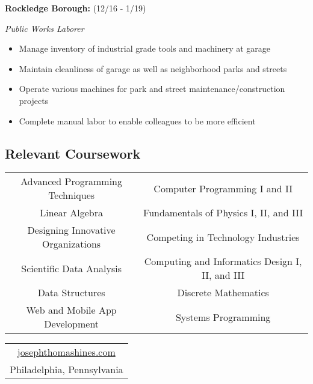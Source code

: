 \documentclass[10pt]{article}
\begin{document}
\begin{multicols}{2}
\textbf{Rockledge Borough:} (12/16 - 1/19)

\emph{Public Works Laborer}

\begin{itemize}
\setlength\itemsep{0.5em}
\item Manage inventory of industrial grade tools and machinery
at garage
\item Maintain cleanliness of garage as well as neighborhood
parks and streets
\item Operate various machines for park and street
	maintenance/construction projects
\item Complete manual labor to enable colleagues to be more
efficient
\end{itemize}

\end{multicols}

\subsection*{Relevant Coursework}%
\label{sub:Relevant Coursework}

\null

\begin{center}
\begin{tabular}{cc}
	\hline
	Advanced Programming Techniques & Computer Programming I and II \\
	Linear Algebra & Fundamentals of Physics I, II, and III \\
	Designing Innovative Organizations & Competing in Technology Industries \\
	Scientific Data Analysis & Computing and Informatics Design I, II, and III \\
	Data Structures & Discrete Mathematics \\
	Web and Mobile App Development & Systems Programming  \\
	\hline
\end{tabular}

\null

\null

\begin{tabular}{c}
	\href{http://josephthomashines.com}{josephthomashines.com} \\
	Philadelphia, Pennsylvania \\
\end{tabular}
\end{center}
\end{document}
